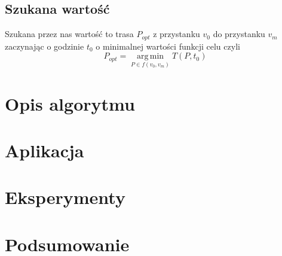 \documentclass{article}
\begin{document}
\subsection{Szukana wartość}
Szukana przez nas wartość to trasa \(P_{opt}\) z przystanku \(v_0\) do przystanku \(v_m\) zaczynając o godzinie \(t_0\)
o minimalnej wartości funkcji celu czyli
\[P_{opt} = \operatorname*{\arg\,\min}_{P\in f(v_0, v_m)} T(P, t_0)\]

\section{Opis algorytmu}

\section{Aplikacja}

\section{Eksperymenty}

\section{Podsumowanie}
\end{document}
